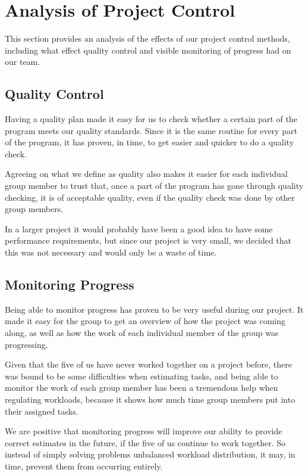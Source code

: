 \section{Analysis of Project Control}
This section provides an analysis of the effects of our project control methods,
including what effect quality control and visible monitoring of progress had on
our team.

\subsection{Quality Control}
\label{sec:AnalysisQualityControl}
Having a quality plan made it easy for us to check whether a certain part of the
program meets our quality standards. Since it is the same routine for every part
of the program, it has proven, in time, to get easier and quicker to do a quality
check.

Agreeing on what we define as quality also makes it easier for each individual
group member to trust that, once a part of the program has gone through quality
checking, it is of acceptable quality, even if the quality check was done by
other group members.

In a larger project it would probably have been a good idea to have some
performance requirements, but since our project is very small, we decided that
this was not necessary and would only be a waste of time.

\subsection{Monitoring Progress}
Being able to monitor progress has proven to be very useful during our project. It
made it easy for the group to get an overview of how the project was coming along,
as well as how the work of each individual member of the group was progressing.

Given that the five of us have never worked together on a project before, there was
bound to be some difficulties when estimating tasks, and being able to monitor the
work of each group member has been a tremendous help when regulating workloads,
because it shows how much time group members put into their assigned tasks.

We are positive that monitoring progress will improve our ability to provide correct
estimates in the future, if the five of us continue to work together. So instead of
simply solving problems unbalanced workload distribution, it may, in time, prevent
them from occurring entirely.